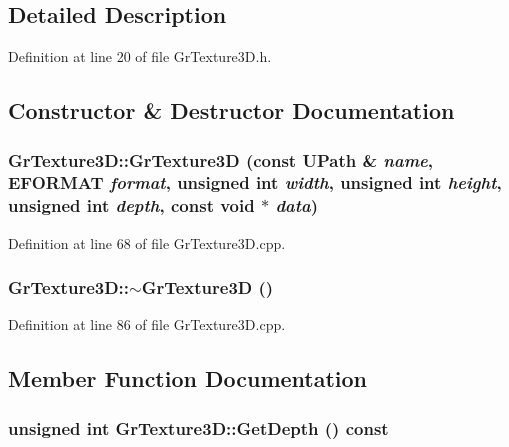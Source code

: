 \subsection{Detailed Description}


Definition at line 20 of file GrTexture3D.h.

\subsection{Constructor \& Destructor Documentation}
\hypertarget{class_gr_texture3_d_c3611bc956309cc465c8c03433e72286}{
\subsubsection[{GrTexture3D}]{\setlength{\rightskip}{0pt plus 5cm}GrTexture3D::GrTexture3D (const {\bf UPath} \& {\em name}, \/  {\bf EFORMAT} {\em format}, \/  unsigned int {\em width}, \/  unsigned int {\em height}, \/  unsigned int {\em depth}, \/  const void $\ast$ {\em data})}}
\label{class_gr_texture3_d_c3611bc956309cc465c8c03433e72286}




Definition at line 68 of file GrTexture3D.cpp.\hypertarget{class_gr_texture3_d_9a050242b03ed0a5964bb65dbcaef192}{
\subsubsection[{$\sim$GrTexture3D}]{\setlength{\rightskip}{0pt plus 5cm}GrTexture3D::$\sim$GrTexture3D ()}}
\label{class_gr_texture3_d_9a050242b03ed0a5964bb65dbcaef192}




Definition at line 86 of file GrTexture3D.cpp.

\subsection{Member Function Documentation}
\hypertarget{class_gr_texture3_d_cca9d3ad504ee989804be666689e55d2}{
\subsubsection[{GetDepth}]{\setlength{\rightskip}{0pt plus 5cm}unsigned int GrTexture3D::GetDepth () const}}
\label{class_gr_texture3_d_cca9d3ad504ee989804be666689e55d2}




